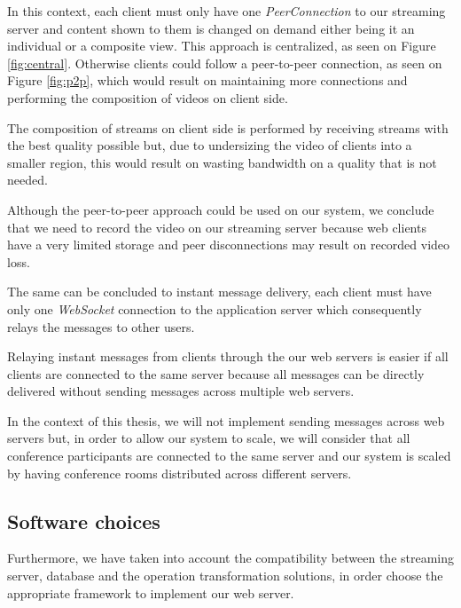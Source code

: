 	In this context, each client must only have one \emph{PeerConnection} to our streaming server and content shown to them is changed on demand either being it an individual or a composite view. This approach is centralized, as seen on Figure \ref{fig:central}. Otherwise clients could follow a peer-to-peer connection, as seen on Figure \ref{fig:p2p}, which would result on maintaining more connections and performing the composition of videos on client side.

	The composition of streams on client side is performed by receiving streams with the best quality possible but, due to undersizing the video of clients into a smaller region, this would result on wasting bandwidth on a quality that is not needed.

	Although the peer-to-peer approach could be used on our system, we conclude that we need to record the video on our streaming server because web clients have a very limited storage and peer disconnections may result on recorded video loss. 

	The same can be concluded to instant message delivery, each client must have only one \emph{WebSocket} connection to the application server which consequently relays the messages to other users.

	Relaying instant messages from clients through the our web servers is easier if all clients are connected to the same server because all messages can be directly delivered without sending messages across multiple web servers. 

	In the context of this thesis, we will not implement sending messages across web servers but, in order to allow our system to scale, we will consider that all conference participants are connected to the same server and our system is scaled by having conference rooms distributed across different servers.

\subsection{Software choices}

Furthermore, we have taken into account the compatibility between the streaming server, database and the operation transformation solutions, in order choose the appropriate framework to implement our web server.

